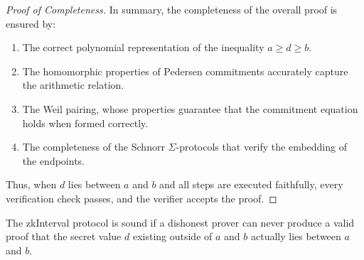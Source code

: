 \documentclass[version=preprint]{iacrcc}
\begin{document}
\begin{proof}[Proof of Completeness]
  In summary, the completeness of the overall proof is ensured by:
  \begin{enumerate}
      \item The correct polynomial representation of the inequality \(a \geq d \geq b\).
      \item The homomorphic properties of Pedersen commitments accurately capture the arithmetic relation.
      \item The Weil pairing, whose properties guarantee that the commitment equation holds when formed correctly.
      \item The completeness of the Schnorr \(\Sigma\)-protocols that verify the embedding of the endpoints.
  \end{enumerate}
  Thus, when \(d\) lies between \(a\) and \(b\) and all steps are executed faithfully, every verification check passes, and the verifier accepts the proof.
\end{proof}

The zkInterval protocol is sound if a dishonest prover can never produce a valid proof that the secret value \( d \) existing outside of \( a \) and \( b \) actually lies between \( a \) and \( b \).
\end{document}
